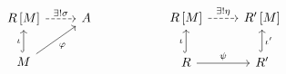\documentclass{article}
\begin{document}
    \begin{equation*}
        \begin{tikzcd}
            R\l[M\r] \ar[r, "\ex!\sigma", dashed] & A \\
            M \ar[u, "\iota", hookrightarrow] \ar[ur, "\phi"']
        \end{tikzcd}\ \ \ \ \ \ \ \ \ \ \ \ \ \ \ \ 
        \begin{tikzcd}
            R\l[M\r] \ar [r, "\ex!\eta", dashed] & R'\l[M\r] \\
            R \ar[r, "\psi"] \ar[u, "\iota", hookrightarrow] & R' \ar[u, "\iota'"', hookrightarrow]
        \end{tikzcd}
    \end{equation*}
\end{document}
